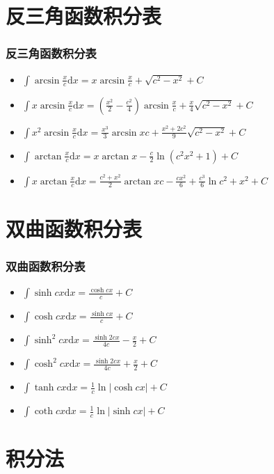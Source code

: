 \documentclass[UTF8, aspectratio = 169, fontsize = 12, hyperref]{ctexbeamer}
\begin{document}
    \section{反三角函数积分表}
    \begin{frame}
        \frametitle{反三角函数积分表}
        \begin{itemize}
            \item $\int{\arcsin{\frac{x}{c}}}\mathrm{d}x=x\arcsin{\frac{x}{c}}+\sqrt{c^2-x^2}+C$
            \item $\int{x\arcsin{\frac{x}{c}}\mathrm{d}x=(\frac{x^2}{2}-\frac{c^2}{4})\arcsin{\frac{x}{c}}}+\frac{x}{4}\sqrt{c^2-x^2}+C$
            \item $\int{x^2\arcsin{\frac{x}{c}}}\mathrm{d}x=\frac{x^3}{3}\arcsin{x}{c}+\frac{x^2+2c^2}{9}\sqrt{c^2-x^2}+C$
            \item $\int{\arctan{\frac{x}{c}}}\mathrm{d}x=x\arctan{x}-\frac{c}{2}\ln(c^2x^2+1)+C$
            \item $\int{x\arctan{\frac{x}{c}}}\mathrm{d}x=\frac{c^2+x^2}{2}\arctan{x}{c}-\frac{cx^2}{6}+\frac{c^3}{6}\ln{c^2}+x^2+C$
        \end{itemize}
    \end{frame}
    \section{双曲函数积分表}
    \begin{frame}
        \frametitle{双曲函数积分表}
        \begin{itemize}
            \item $\int{\sinh{cx}}\mathrm{d}x=\frac{\cosh{cx}}{c}+C$
            \item $\int{\cosh{cx}}\mathrm{d}x=\frac{\sinh{cx}}{c}+C$
            \item $\int{\sinh^2{cx}}\mathrm{d}x=\frac{\sinh{2cx}}{4c}-\frac{x}{2}+C$
            \item $\int{\cosh^2{cx}}\mathrm{d}x=\frac{\sinh{2cx}}{4c}+\frac{x}{2}+C$
            \item $\int{\tanh{cx}}\mathrm{d}x=\frac{1}{c}\ln{|\cosh{cx}|}+C$
            \item $\int{\coth{cx}}\mathrm{d}x=\frac{1}{c}\ln{|\sinh{cx}|}+C$
        \end{itemize}
    \end{frame}
    \section{积分法}
\end{document}
